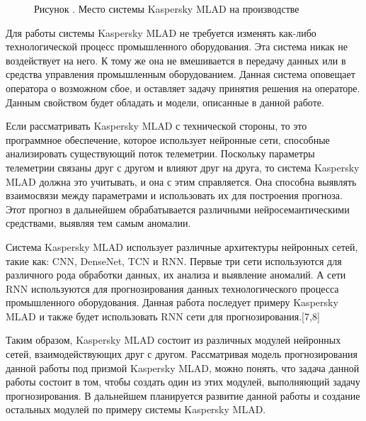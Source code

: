 {  \begin{figure}[H]
    \centering
    \def\svgwidth{\textwidth}
    
    \caption*{\gostFont Рисунок \thechaptercntr .\theimagecntr \spc {--} Место системы Kaspersky MLAD на производстве}
    \label{fig:MLADBlackBox}
  \end{figure} \addtocounter{imagecntr}{1}

  \par \redline Для работы системы Kaspersky MLAD не требуется изменять как-либо технологической процесс промышленного оборудования. Эта система никак не воздействует на него. К тому же она не вмешивается в передачу данных или в средства управления промышленным оборудованием. Данная система оповещает оператора о возможном сбое, и оставляет задачу принятия решения на операторе. Данным свойством будет обладать и модели, описанные в данной работе.

  \par \redline Если рассматривать Kaspersky MLAD с технической стороны, то это программное обеспечение, которое использует нейронные сети, способные анализировать существующий поток телеметрии. Поскольку параметры телеметрии связаны друг с другом и влияют друг на друга, то система Kaspersky MLAD должна это учитывать, и она с этим справляется. Она способна выявлять взаимосвязи между параметрами и использовать их для построения прогноза. Этот прогноз в дальнейшем обрабатывается различными нейросемантическими средствами, выявляя тем самым аномалии.

  \par \redline Система Kaspersky MLAD использует различные архитектуры нейронных сетей, такие как: CNN, DenseNet, TCN и RNN. Первые три сети используются для различного рода обработки данных, их анализа и выявление аномалий. А сети RNN используются для прогнозирования данных технологического процесса промышленного оборудования. Данная работа последует примеру Kaspersky MLAD и также будет использовать RNN сети для прогнозирования.[7,8]

  \par \redline Таким образом, Kaspersky MLAD состоит из различных модулей нейронных сетей, взаимодействующих друг с другом. Рассматривая модель прогнозирования данной работы под призмой Kaspersky MLAD, можно понять, что задача данной работы состоит в том, чтобы создать один из этих модулей, выполняющий задачу прогнозирования. В дальнейшем планируется развитие данной работы и создание остальных модулей по примеру системы Kaspersky MLAD.

}
